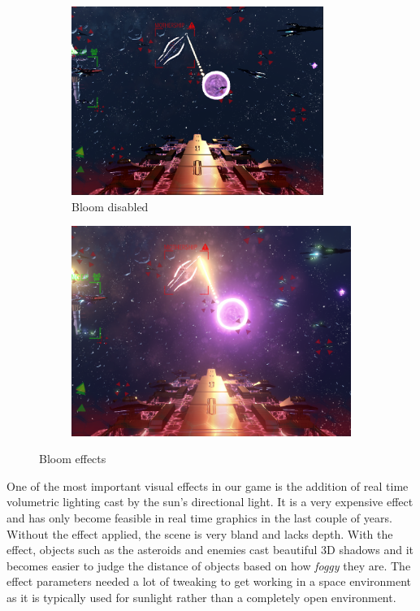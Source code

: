 \documentclass[a4paper,11pt]{article}
\begin{document}
\begin{figure}[ht]
	\centering
    
    \begin{subfigure}{.5\textwidth}
      \centering
      \includegraphics[width=0.9\textwidth]{bloomOff}
      \caption{Bloom disabled}
      \label{fig:bloomOff}
    \end{subfigure}%
    \begin{subfigure}{.5\textwidth}
    	\centering
		\includegraphics[width=.9\textwidth]{bloomOn}
        \label{fig:bloomOn}
	\end{subfigure}
	\caption{Bloom effects}
	\label{fig:bloom}
\end{figure}

One of the most important visual effects in our game is the addition of real time volumetric lighting cast by the sun’s directional light. It is a very expensive effect and has only become feasible in real time graphics in the last couple of years. Without the effect applied, the scene is very bland and lacks depth. With the effect, objects such as the asteroids and enemies cast beautiful 3D shadows and it becomes easier to judge the distance of objects based on how \emph{foggy} they are. The effect parameters needed a lot of tweaking to get working in a space environment as it is typically used for sunlight rather than a completely open environment.
\end{document}
